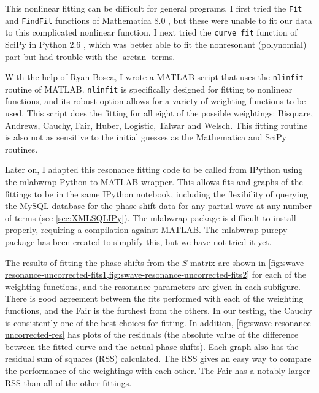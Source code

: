 \documentclass[Dissertation.tex]{subfiles}
\begin{document}
This nonlinear fitting can be difficult for general programs. I first tried the \texttt{Fit} and \texttt{FindFit} functions of Mathematica\textsuperscript{\textregistered} 8.0 \cite{Mathematica}, but these were unable to fit our data to this complicated nonlinear function. I next tried the \texttt{curve\_fit} function of SciPy \cite{SciPy} in Python\textsuperscript{\textregistered} 2.6 \cite{Python}, which was better able to fit the nonresonant (polynomial) part but had trouble with the $\arctan$ terms.

With the help of Ryan Bosca, I wrote a MATLAB\textsuperscript{\textregistered} \cite{matlab} script that uses the \texttt{nlinfit} routine of MATLAB. \texttt{nlinfit} is specifically designed for fitting to nonlinear functions, and its robust option allows for a variety of weighting functions to be used. This script does the fitting for all eight of the possible weightings: Bisquare, Andrews, Cauchy, Fair, Huber, Logistic, Talwar and Welsch. This fitting routine is also not as sensitive to the initial guesses as the Mathematica and SciPy routines.

Later on, I adapted this resonance fitting code to be called from IPython \cite{ipython} using the mlabwrap \cite{mlabwrap} Python to MATLAB wrapper. This allows fits and graphs of the fittings to be in the same IPython notebook, including the flexibility of querying the MySQL database for the phase shift data for any partial wave at any number of terms (see \cref{sec:XMLSQLIPy}). The mlabwrap package is difficult to install properly, requiring a compilation against MATLAB. The mlabwrap-purepy package \cite{mlabwrappurepy} has been created to simplify this, but we have not tried it yet.

The results of fitting the phase shifts from the $S$ matrix are shown in \cref{fig:swave-resonance-uncorrected-fits1,fig:swave-resonance-uncorrected-fits2} for each of the weighting functions, and the resonance parameters are given in each subfigure. There is good agreement between the fits performed with each of the weighting functions, and the Fair is the furthest from the others. In our testing, the Cauchy is consistently one of the best choices for fitting. In addition, \cref{fig:swave-resonance-uncorrected-res} has plots of the residuals (the absolute value of the difference between the fitted curve and the actual phase shifts). Each graph also has the residual sum of squares (RSS) calculated. The RSS gives an easy way to compare the performance of the weightings with each other. The Fair has a notably larger RSS than all of the other fittings.
\end{document}
